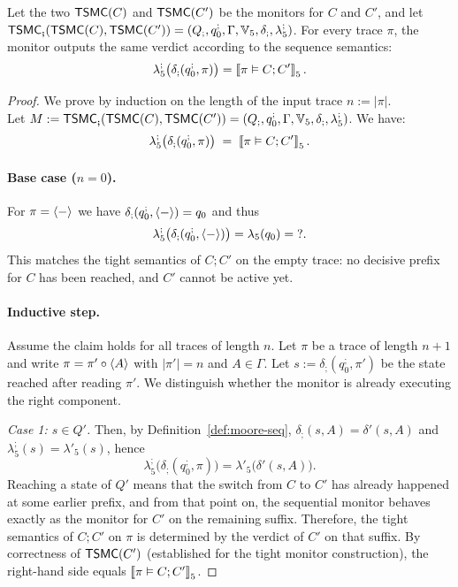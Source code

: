 \begin{lemma}
\label{lem:seq-correct}
Let the two $\mathsf{TSMC}(C)$ and $\mathsf{TSMC}(C')$ be the monitors for $C$ and $C'$,
and let $\mathsf{TSMC}_{\bm{;}}(\mathsf{TSMC}(C),\mathsf{TSMC}(C'))
= (Q_{;}, q_0^{;}, \Gamma, \mathbb{V}_5 , \delta_{;}, \lambda_5^{;})$. For every trace $\pi$, the monitor outputs the same verdict according to the sequence semantics:
\[
\lambda_5^{;}\big(\delta_{;}(q_0^{;},\pi)\big)=
\left\llbracket \pi \vDash C;C' \right\rrbracket_{5}.
\]
\end{lemma}


\begin{proof}
    We prove by induction on the length of the input trace $n:=|\pi|$.
    \\Let $M:=\mathsf{TSMC}_{\bm{;}}(\mathsf{TSMC}(C),\mathsf{TSMC}(C'))=(Q_{;}, q_0^{;}, \Gamma, \mathbb{V}_5 , \delta_{;}, \lambda_5^{;})$. We have:
    \[
    \lambda_5^{;}\big(\delta_{;}(q_0^{;},\pi)\big)
    \;=\;
    \left\llbracket \pi \vDash C;C' \right\rrbracket_{5}.
    \]
    
    \paragraph{Base case ($n=0$).}
    For $\pi=\langle - \rangle $ we have $\delta_{;}(q_0^{;},\langle - \rangle )=q_0$ and thus
    \[
    \lambda_5^{;}\big(\delta_{;}(q_0^{;},\langle - \rangle )\big)=\lambda_5(q_0)=\mathsf{?}.
    \]
    This matches the tight semantics of $C;C'$ on the empty trace: no decisive prefix for $C$ has been reached, and $C'$ cannot be active yet.
    
    \paragraph{Inductive step.}
    Assume the claim holds for all traces of length $n$.
    Let $\pi$ be a trace of length $n{+}1$ and write $\pi=\pi'\circ\langle A \rangle $ with $|\pi'|=n$ and $A\in\Gamma$.
    Let $s:=\delta_{;}(q_0^{;},\pi')$ be the state reached after reading $\pi'$.
    We distinguish whether the monitor is already executing the right component.
    
    \smallskip
    \noindent\emph{Case 1: $s\in Q'$.}
    Then, by Definition~\ref{def:moore-seq}, $\delta_{;}(s,A)=\delta'(s,A)$ and $\lambda_5^{;}(s)=\lambda'_5(s)$, hence
    \[
    \lambda_5^{;}\big(\delta_{;}(q_0^{;},\pi)\big)
    =
    \lambda'_5\big(\delta'(s,A)\big).
    \]
    Reaching a state of $Q'$ means that the switch from $C$ to $C'$ has already happened at some earlier prefix, and from that point on, the sequential monitor behaves exactly as the monitor for $C'$ on the remaining suffix.
    Therefore, the tight semantics of $C;C'$ on $\pi$ is determined by the verdict of $C'$ on that suffix.
    By correctness of $\mathsf{TSMC}(C')$ (established for the tight monitor construction),
    the right-hand side equals $\left\llbracket \pi \vDash C;C' \right\rrbracket_{5}$.
    

\end{proof}
